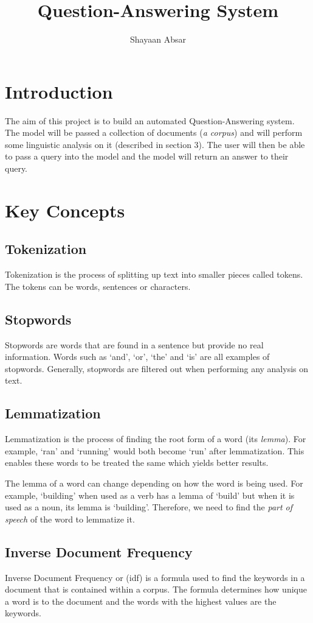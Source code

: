 \documentclass{article}
\title{Question-Answering System}
\date{}
\author{Shayaan Absar}
\begin{document}
\maketitle

\section{Introduction}
The aim of this project is to build an automated Question-Answering system. The model will be passed a collection of documents (\emph{a corpus}) and will perform some linguistic analysis on it (described in section 3). The user will then be able to pass a query into the model and the model will return an answer to their query.

\section{Key Concepts}
\subsection{Tokenization}
Tokenization is the process of splitting up text into smaller pieces called tokens. The tokens can be words, sentences or characters.
\subsection{Stopwords}
Stopwords are words that are found in a sentence but provide no real information. Words such as `and', `or', `the' and `is' are all examples of stopwords. Generally, stopwords are filtered out when performing any analysis on text.

\subsection{Lemmatization}
Lemmatization is the process of finding the root form of a word (its \emph{lemma}). For example, `ran' and `running' would both become `run' after lemmatization. This enables these words to be treated the same which yields better results.

The lemma of a word can change depending on how the word is being used. For example, `building' when used as a verb has a lemma of `build' but when it is used as a noun, its lemma is `building'. Therefore, we need to find the \emph{part of speech} of the word to lemmatize it.

\subsection{Inverse Document Frequency}
Inverse Document Frequency or (idf) is a formula used to find the keywords in a document that is contained within a corpus. The formula determines how unique a word is to the document and the words with the highest values are the keywords.
\end{document}
